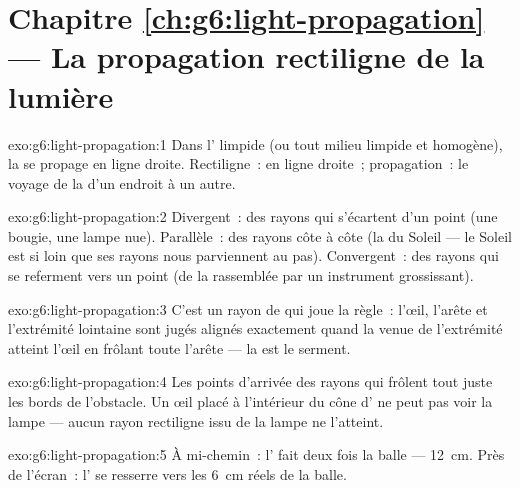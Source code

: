 \section*{Chapitre \ref{ch:g6:light-propagation} --- La propagation rectiligne de la lumière}

\begin{solution}{exo:g6:light-propagation:1}
Dans l' limpide (ou tout milieu limpide et homogène), la 
se propage en ligne droite. Rectiligne~: en ligne droite~;
propagation~: le voyage de la  d'un endroit à un autre.
\end{solution}

\begin{solution}{exo:g6:light-propagation:2}
Divergent~: des rayons qui s'écartent d'un point (une bougie, une
lampe nue). Parallèle~: des rayons côte à côte (la  du
Soleil --- le Soleil est si loin que ses rayons nous parviennent au
pas). Convergent~: des rayons qui se referment vers un point (de la
 rassemblée par un instrument grossissant).
\end{solution}

\begin{solution}{exo:g6:light-propagation:3}
C'est un rayon de  qui joue la règle~: l'œil, l'arête et
l'extrémité lointaine sont jugés alignés exactement quand la 
venue de l'extrémité atteint l'œil en frôlant toute l'arête --- la
 est le serment.
\end{solution}

\begin{solution}{exo:g6:light-propagation:4}
Les points d'arrivée des rayons qui frôlent tout juste les bords de
l'obstacle. Un œil placé à l'intérieur du cône d' ne peut pas
voir la lampe --- aucun rayon rectiligne issu de la lampe ne
l'atteint.
\end{solution}

\begin{solution}{exo:g6:light-propagation:5}
À mi-chemin~: l' fait deux fois la balle --- \qty{12}{cm}. Près
de l'écran~: l' se resserre vers les \qty{6}{cm} réels de la
balle.
\end{solution}

